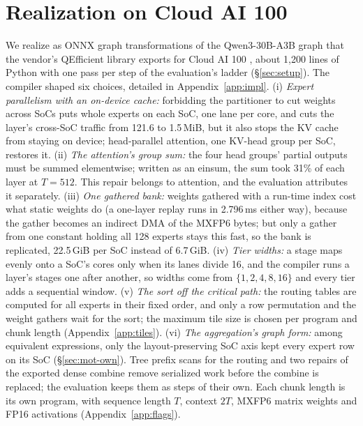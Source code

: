 \section{Realization on Cloud AI 100}
\label{sec:impl}

We realize \sys as ONNX graph transformations of the Qwen3-30B-A3B graph that the vendor's QEfficient library exports for
Cloud AI 100 \citep{qefficient}, about 1,200 lines of Python with one pass per step of the evaluation's ladder
(\S\ref{sec:setup}). The compiler shaped six choices, detailed in Appendix~\ref{app:impl}. (i) \emph{Expert parallelism
with an on-device cache:} forbidding the partitioner to cut weights across SoCs puts whole experts on each SoC, one lane
per core, and cuts the layer's cross-SoC traffic from 121.6 to 1.5\,MiB, but it also stops the KV cache from staying on
device; head-parallel attention, one KV-head group per SoC, restores it. (ii) \emph{The attention's group sum:} the four
head groups' partial outputs must be summed elementwise; written as an einsum, the sum took 31\% of each layer at $T=512$.
This repair belongs to attention, and the evaluation attributes it separately. (iii) \emph{One
gathered bank:} weights gathered with a run-time index cost what static weights do (a one-layer replay runs in 2.796\,ms
either way), because the gather becomes an indirect DMA of the MXFP6 bytes; but only a gather from one constant holding all
128 experts stays this fast, so the bank is replicated, 22.5\,GiB per SoC instead of 6.7\,GiB. (iv) \emph{Tier widths:} a stage maps evenly onto a SoC's cores only when
its lanes divide 16, and the compiler runs a layer's stages one after another, so widths come from $\{1,2,4,8,16\}$ and every
tier adds a sequential window. (v) \emph{The sort off the critical path:} the routing tables are computed for all experts in
their fixed order, and only a row permutation and the weight gathers wait for the sort; the maximum tile size is chosen per
program and chunk length (Appendix~\ref{app:tiles}). (vi) \emph{The aggregation's graph form:} among equivalent
expressions, only the layout-preserving SoC axis kept every expert row on its SoC (\S\ref{sec:mot-own}). Tree prefix scans for the
routing and two repairs of the exported dense combine remove serialized work before the combine is replaced; the
evaluation keeps them as steps of their own. Each chunk length is its own program, with sequence length $T$, context $2T$,
MXFP6 matrix weights and FP16 activations (Appendix~\ref{app:flags}).
